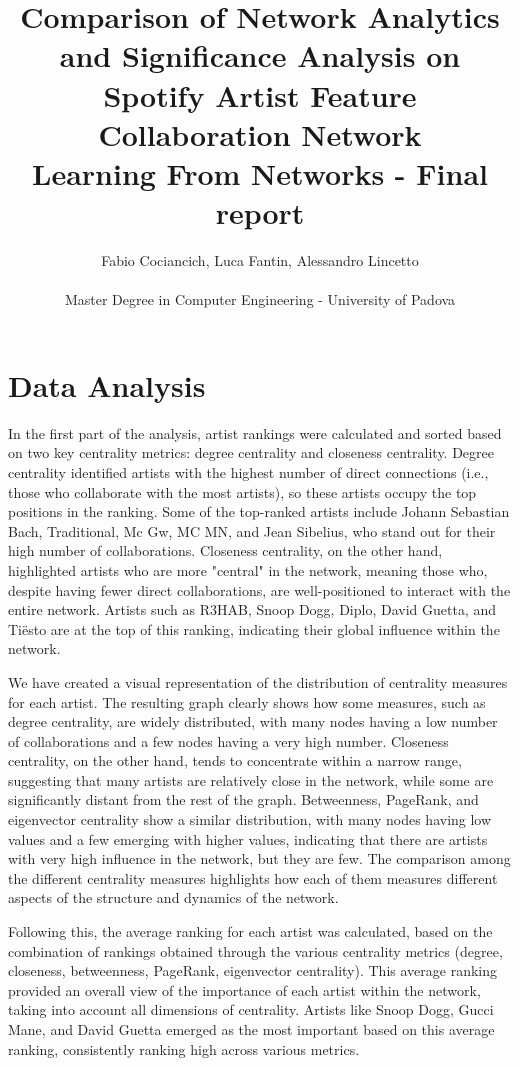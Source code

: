 \documentclass[a4paper, 12pt, conference]{ieeeconf}      %
\title{Comparison of Network Analytics and Significance Analysis on Spotify Artist Feature Collaboration Network\\
\large Learning From Networks - Final report \\}
\author{Fabio Cociancich, Luca Fantin, Alessandro Lincetto %
\\\\ Master Degree in Computer Engineering - University of Padova \\
}
\begin{document}
\maketitle
\thispagestyle{plain}
\pagestyle{plain}

\section{Data Analysis}
In the first part of the analysis, artist rankings were calculated and sorted based on two key centrality metrics: degree centrality and closeness centrality. Degree centrality identified artists with the highest number of direct connections (i.e., those who collaborate with the most artists), so these artists occupy the top positions in the ranking. Some of the top-ranked artists include Johann Sebastian Bach, Traditional, Mc Gw, MC MN, and Jean Sibelius, who stand out for their high number of collaborations. Closeness centrality, on the other hand, highlighted artists who are more "central" in the network, meaning those who, despite having fewer direct collaborations, are well-positioned to interact with the entire network. Artists such as R3HAB, Snoop Dogg, Diplo, David Guetta, and Tiësto are at the top of this ranking, indicating their global influence within the network.

We have created a visual representation of the distribution of centrality measures for each artist. The resulting graph clearly shows how some measures, such as degree centrality, are widely distributed, with many nodes having a low number of collaborations and a few nodes having a very high number. Closeness centrality, on the other hand, tends to concentrate within a narrow range, suggesting that many artists are relatively close in the network, while some are significantly distant from the rest of the graph. Betweenness, PageRank, and eigenvector centrality show a similar distribution, with many nodes having low values and a few emerging with higher values, indicating that there are artists with very high influence in the network, but they are few. The comparison among the different centrality measures highlights how each of them measures different aspects of the structure and dynamics of the network.

Following this, the average ranking for each artist was calculated, based on the combination of rankings obtained through the various centrality metrics (degree, closeness, betweenness, PageRank, eigenvector centrality). This average ranking provided an overall view of the importance of each artist within the network, taking into account all dimensions of centrality. Artists like Snoop Dogg, Gucci Mane, and David Guetta emerged as the most important based on this average ranking, consistently ranking high across various metrics.
\end{document}

